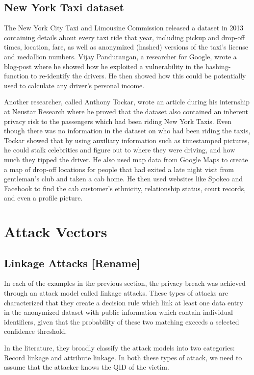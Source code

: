 \subsection{New York Taxi dataset} 
The New York City Taxi and Limousine Commission released a dataset in 2013 containing details about every taxi ride that year, including pickup and drop-off times, location, fare, as well as anonymized (hashed) versions of the taxi's license and medallion numbers. Vijay Pandurangan, a researcher for Google, wrote a blog-post where he showed how he exploited a vulnerability in the hashing-function to re-identify the drivers. He then showed how this could be potentially used to calculate any driver's personal income\cite{vijay2014online}. 

Another researcher, called Anthony Tockar, wrote an article during his internship at Neustar Research where he proved that the dataset also contained an inherent privacy risk to the passengers which had been riding New York Taxis. Even though there was no information in the dataset on who had been riding the taxis, Tockar showed that by using auxiliary information such as timestamped pictures, he could stalk celebrities and figure out to where they were driving, and how much they tipped the driver. He also used map data from Google Maps to create a map of drop-off locations for people that had exited a late night visit from gentleman's club and taken a cab home. He then used websites like Spokeo and Facebook to find the cab customer's ethnicity, relationship status, court records, and even a profile picture\cite{tockar2014online}.

\section{Attack Vectors}
\label{section:attack_vectors}


\subsection{Linkage Attacks [Rename]}
In each of the examples in the previous section, the privacy breach was achieved through an attack model called linkage attacks. These types of attacks are characterized that they create a decision rule which link at least one data entry in the anonymized dataset with public information which contain individual identifiers, given that the probability of these two matching exceeds a selected confidence threshold. 

In the literature\cite{bonchi2010privacybook,fung2010privacybook}, they broadly classify the attack models into two categories: Record linkage and attribute linkage. In both these types of attack, we need to assume that the attacker knows the QID of the victim.

